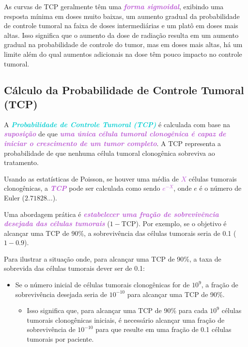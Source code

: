 \documentclass[11pt,a4paper]{article}
\newcounter{exemplo}
\begin{document}
	As curvas de TCP geralmente têm uma \textcolor{MediumOrchid}{\textbf{\textit{forma sigmoidal}}}, exibindo uma resposta mínima em doses muito baixas, um aumento gradual da probabilidade de controle tumoral na faixa de doses intermediárias e um platô em doses mais altas. Isso significa que o aumento da dose de radiação resulta em um aumento gradual na probabilidade de controle do tumor, mas em doses mais altas, há um limite além do qual aumentos adicionais na dose têm pouco impacto no controle tumoral.


\subsection*{Cálculo da Probabilidade de Controle Tumoral (TCP)}

	A \textcolor{DarkTurquoise}{\textbf{\textit{Probabilidade de Controle Tumoral (TCP)}}} é calculada com base na \textcolor{MediumOrchid}{\textbf{\textit{suposição}}} de que \textcolor{MediumOrchid}{\textbf{\textit{uma única célula tumoral clonogênica é capaz de iniciar o crescimento de um tumor completo}}}. A TCP representa a probabilidade de que nenhuma célula tumoral clonogênica sobreviva ao tratamento.

	Usando as estatísticas de Poisson, se houver uma média de \textcolor{MediumOrchid}{\textbf{\textit{$X$}}} células tumorais clonogênicas, a \textcolor{MediumOrchid}{\textbf{\textit{TCP}}} pode ser calculada como sendo \textcolor{MediumOrchid}{\textbf{\textit{$e^{-X}$}}}, onde $e$ é o número de Euler ($2.71828...$).

	Uma abordagem prática é \textcolor{MediumOrchid}{\textbf{\textit{estabelecer uma fração de sobrevivência desejada das células tumorais}}} ($1 - \text{TCP}$). Por exemplo, se o objetivo é alcançar uma TCP de 90\%, a sobrevivência das células tumorais seria de 0.1 ($1 - 0.9$).

	\begin{tcolorbox}[width=\textwidth, colback={white}, colbacktitle={DarkTurquoise!50!white}, title={$\bigstar$ \LobsterTwo{Para Entender Melhor} $\bigstar$}, coltitle={CarnationPink}, colframe={DarkTurquoise}, fonttitle=\rmfamily\bfseries\Large, breakable]

		Para ilustrar a situação onde, para  alcançar uma TCP de 90\%, a taxa de sobrevida das células tumorais dever ser de 0.1:
		
		\begin{itemize}[label=\textcolor{CarnationPink}{$\blacktriangleright$}]
			\item Se o número inicial de células tumorais clonogênicas for de $10^9$, a fração de sobrevivência desejada seria de $10^{-10}$ para alcançar uma TCP de 90\%. 
				\begin{itemize}[label=\textcolor{CarnationPink}{$\star$}]
					\item Isso significa que, para alcançar uma TCP de 90\% para cada $10^9$ células tumorais clonogênicas iniciais, é necessário alcançar uma fração de sobrevivência de $10^{-10}$ para que resulte em uma fração de 0.1 células tumorais por paciente. 
				\end{itemize}
			\end{itemize}
	\end{tcolorbox}
\end{document}
